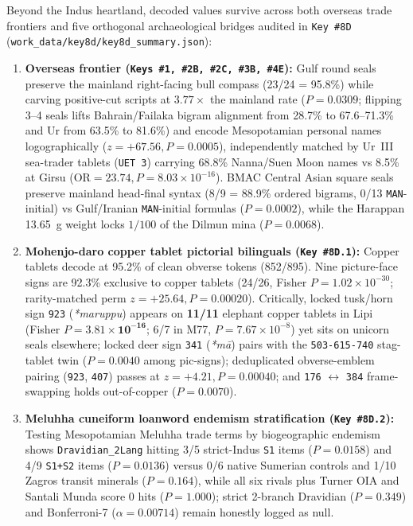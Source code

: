 \documentclass[11pt,a4paper]{article}
\begin{document}
Beyond the Indus heartland, decoded values survive across both overseas trade frontiers \citep{gadd1932,laursen2010,steinkeller1982} and five orthogonal archaeological bridges audited in \texttt{Key \#8D} (\texttt{work\_data/key8d/key8d\_summary.json}):
\begin{enumerate}
  \item \textbf{Overseas frontier (\texttt{Keys \#1, \#2B, \#2C, \#3B, \#4E}):} Gulf round seals preserve the mainland right-facing bull compass (23/24 = 95.8\%) while carving positive-cut scripts at $3.77\times$ the mainland rate ($P = 0.0309$; flipping 3--4 seals lifts Bahrain/Failaka bigram alignment from 28.7\% to 67.6--71.3\% and Ur from 63.5\% to 81.6\%) and encode Mesopotamian personal names logographically ($z = +67.56, P = 0.0005$), independently matched by Ur~III sea-trader tablets (\texttt{UET 3}) carrying 68.8\% Nanna/Suen Moon names vs 8.5\% at Girsu ($\text{OR} = 23.74, P = 8.03 \times 10^{-16}$). BMAC Central Asian square seals preserve mainland head-final syntax (8/9 = 88.9\% ordered bigrams, 0/13 \texttt{MAN}-initial) vs Gulf/Iranian \texttt{MAN}-initial formulas ($P = 0.0002$), while the Harappan 13.65~g weight locks $1/100$ of the Dilmun mina ($P = 0.0068$).
  \item \textbf{Mohenjo-daro copper tablet pictorial bilinguals (\texttt{Key \#8D.1}):} Copper tablets decode at 95.2\% of clean obverse tokens (852/895). Nine picture-face signs are 92.3\% exclusive to copper tablets (24/26, Fisher $P = 1.02 \times 10^{-30}$; rarity-matched perm $z = +25.64, P = 0.00020$). Critically, locked tusk/horn sign \texttt{923} (\textit{*maruppu}) appears on \textbf{11/11} elephant copper tablets in Lipi (Fisher $P = \mathbf{3.81 \times 10^{-16}}$; 6/7 in M77, $P = 7.67 \times 10^{-8}$) yet sits on unicorn seals elsewhere; locked deer sign \texttt{341} (\textit{*mā}) pairs with the \texttt{503-615-740} stag-tablet twin ($P = 0.0040$ among pic-signs); deduplicated obverse-emblem pairing (\texttt{923}, \texttt{407}) passes at $z = +4.21, P = 0.00040$; and \texttt{176} $\leftrightarrow$ \texttt{384} frame-swapping holds out-of-copper ($P = 0.0070$).
  \item \textbf{Meluhha cuneiform loanword endemism stratification (\texttt{Key \#8D.2}):} Testing Mesopotamian Meluhha trade terms \citep{parpola1975meluhha,witzel1999substrate} by biogeographic endemism shows \texttt{Dravidian\_2Lang} hitting 3/5 strict-Indus \texttt{S1} items ($P = 0.0158$) and 4/9 \texttt{S1+S2} items ($P = 0.0136$) versus 0/6 native Sumerian controls and 1/10 Zagros transit minerals ($P = 0.164$), while all six rivals plus Turner OIA and Santali Munda score 0 hits ($P = 1.000$); strict 2-branch Dravidian ($P = 0.349$) and Bonferroni-7 ($\alpha = 0.00714$) remain honestly logged as null.

\end{enumerate}
\end{document}
